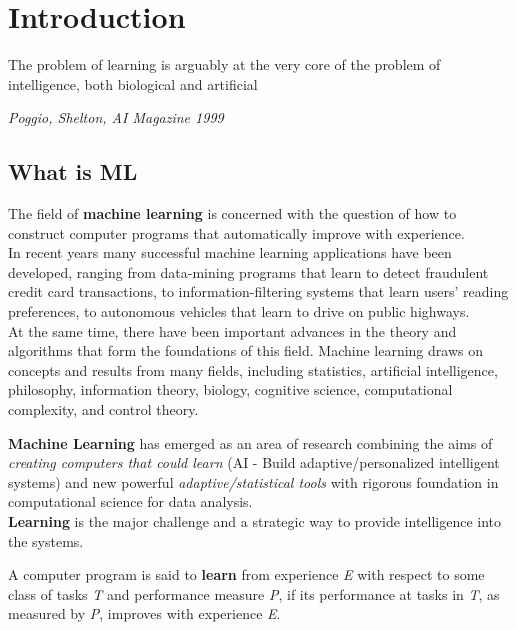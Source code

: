 \documentclass[../main.tex]{subfiles}
\begin{document}
\section{Introduction}
\epigraph{The problem of learning is arguably at the very core of the problem of intelligence, both biological and artificial}{\textit{Poggio, Shelton, AI Magazine 1999}}
\subsection{What is ML}
 The field of \textbf{machine learning} is concerned with the question of how to construct computer programs that automatically improve with experience. \\
In recent years many successful machine learning applications have been developed, ranging from data-mining programs that learn to detect fraudulent credit card transactions, to information-filtering systems that learn users' reading preferences, to autonomous vehicles that learn to drive on public highways. \\
At the same time, there have been important advances in the theory and algorithms that form the foundations of this field. Machine learning draws on concepts and results from many fields, including statistics, artificial intelligence, philosophy, information theory, biology, cognitive science, computational complexity, and control theory.

 \textbf{Machine Learning} has emerged as an area of research combining the aims of \textit{creating computers that could learn} (AI - Build adaptive/personalized intelligent systems) and new powerful \textit{adaptive/statistical tools} with rigorous foundation in computational science for data analysis.\\
\textbf{Learning} is the major challenge and a strategic way to provide intelligence into the systems.

\theoremstyle{definition}
\begin{definition}
A computer program is said to \textbf{learn} from experience \textit{E} with respect to some class of tasks \textit{T} and performance measure \textit{P}, if its performance at tasks in \textit{T}, as measured by \textit{P}, improves with experience \textit{E}.
\end{definition}
\end{document}
